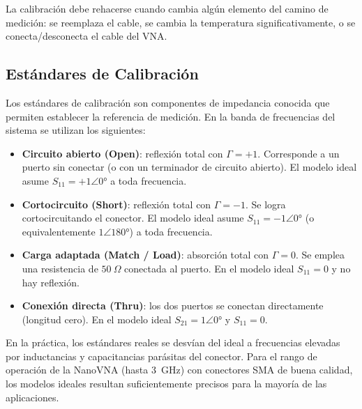 La calibración debe rehacerse cuando cambia algún elemento del camino de
medición: se reemplaza el cable, se cambia la temperatura significativamente,
o se conecta/desconecta el cable del VNA.

\newpage
\Encabezado

\subsection{Estándares de Calibración}
\label{sec:estandares}

Los estándares de calibración son componentes de impedancia conocida que
permiten establecer la referencia de medición. En la banda de frecuencias
del sistema se utilizan los siguientes:

\begin{itemize}
    \item \textbf{Circuito abierto (Open)}: reflexión total con $\Gamma = +1$.
          Corresponde a un puerto sin conectar (o con un terminador de circuito
          abierto). El modelo ideal asume $S_{11} = +1\angle 0°$ a toda
          frecuencia.

    \item \textbf{Cortocircuito (Short)}: reflexión total con $\Gamma = -1$.
          Se logra cortocircuitando el conector. El modelo ideal asume
          $S_{11} = -1\angle 0°$ (o equivalentemente $1\angle 180°$) a toda
          frecuencia.

    \item \textbf{Carga adaptada (Match / Load)}: absorción total con
          $\Gamma = 0$. Se emplea una resistencia de $50~\Omega$ conectada
          al puerto. En el modelo ideal $S_{11} = 0$ y no hay reflexión.

    \item \textbf{Conexión directa (Thru)}: los dos puertos se conectan
          directamente (longitud cero). En el modelo ideal $S_{21} = 1\angle 0°$
          y $S_{11} = 0$.
\end{itemize}

En la práctica, los estándares reales se desvían del ideal a frecuencias
elevadas por inductancias y capacitancias parásitas del conector. Para el
rango de operación de la NanoVNA (hasta 3~GHz) con conectores SMA de buena
calidad, los modelos ideales resultan suficientemente precisos para la mayoría
de las aplicaciones.

